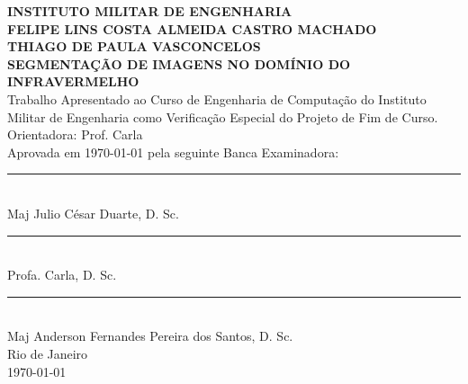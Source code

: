 \begin{center}\large
\textbf{INSTITUTO MILITAR DE ENGENHARIA}\\\vspace{2cm}
\textbf{FELIPE LINS COSTA ALMEIDA CASTRO \textbf{MACHADO}\\
\textbf{THIAGO} DE PAULA \textbf{VASCONCELOS}\\\vspace{2cm}}
\textbf{SEGMENTAÇÃO DE IMAGENS NO DOMÍNIO DO INFRAVERMELHO}\\\vspace{1cm}
Trabalho Apresentado ao Curso de Engenharia
de Computação do Instituto Militar
de Engenharia como Verificação Especial do
Projeto de Fim de Curso.\\\vspace{1cm}
Orientadora: Prof. Carla\\\vspace{1cm}
Aprovada em \today{} pela seguinte Banca Examinadora:\\\vspace{2cm}
\noindent\rule{10cm}{0.4pt}\\
Maj Julio César Duarte, D. Sc. \\\vspace{1cm}
\noindent\rule{10cm}{0.4pt}\\
Profa. Carla, D. Sc.\\\vspace{1cm}
\noindent\rule{10cm}{0.4pt}\\
Maj Anderson Fernandes Pereira dos Santos, D. Sc.\\
\vspace{2cm}
Rio de Janeiro\\
\today{}
\end{center}
